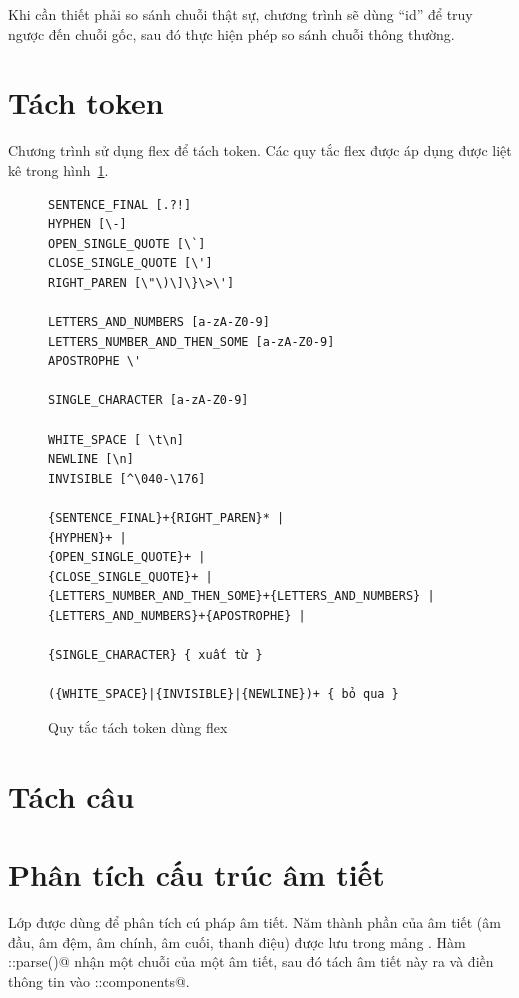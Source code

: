 \documentclass[a4paper,oneside,14pt]{extbook} %
\begin{document}
Khi cần thiết phải so sánh chuỗi thật sự, chương trình sẽ dùng ``id''
để truy ngược đến chuỗi gốc, sau đó thực hiện phép so sánh chuỗi thông thường.

\section{Tách token}
\label{sub:preprocess:token}

Chương trình sử dụng flex để tách token. Các quy tắc flex được áp dụng
được liệt kê trong hình~\ref{fig:flex-token}.
\begin{figure}[htbp]
  \centering
\begin{verbatim}
SENTENCE_FINAL [.?!]
HYPHEN [\-]
OPEN_SINGLE_QUOTE [\`]
CLOSE_SINGLE_QUOTE [\']
RIGHT_PAREN [\"\)\]\}\>\']

LETTERS_AND_NUMBERS [a-zA-Z0-9]
LETTERS_NUMBER_AND_THEN_SOME [a-zA-Z0-9]
APOSTROPHE \'

SINGLE_CHARACTER [a-zA-Z0-9]

WHITE_SPACE [ \t\n]
NEWLINE [\n]
INVISIBLE [^\040-\176]

{SENTENCE_FINAL}+{RIGHT_PAREN}* |
{HYPHEN}+ |
{OPEN_SINGLE_QUOTE}+ |
{CLOSE_SINGLE_QUOTE}+ |
{LETTERS_NUMBER_AND_THEN_SOME}+{LETTERS_AND_NUMBERS} |
{LETTERS_AND_NUMBERS}+{APOSTROPHE} |

{SINGLE_CHARACTER} { xuất từ }

({WHITE_SPACE}|{INVISIBLE}|{NEWLINE})+ { bỏ qua }
\end{verbatim}
  
  \caption{Quy tắc tách token dùng flex}
  \label{fig:flex-token}
\end{figure}


\section{Tách câu}


\section{Phân tích cấu trúc âm tiết}

Lớp \verb@Syllable@ được dùng để phân tích cú pháp âm tiết. Năm thành
phần của âm tiết (âm đầu, âm đệm, âm chính, âm cuối, thanh điệu) được
lưu trong mảng \verb@components@. Hàm \verb@Syllable::parse()@ nhận
một chuỗi của một âm tiết, sau đó tách âm tiết này ra và điền thông
tin vào \verb@Syllable::components@.
\end{document}
